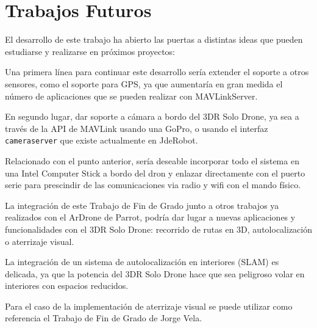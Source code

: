 \section{Trabajos Futuros}

El desarrollo de este trabajo ha abierto las puertas a distintas ideas que pueden estudiarse y realizarse en próximos proyectos:

Una primera línea para continuar este desarrollo sería extender el soporte a otros sensores, como el soporte para GPS, ya que aumentaría en gran medida el número de aplicaciones que se pueden realizar con MAVLinkServer. 

En segundo lugar, dar soporte a cámara a bordo del 3DR Solo Drone, ya sea a través de la API de MAVLink usando una GoPro, o usando el interfaz \texttt{cameraserver} que existe actualmente en JdeRobot.

Relacionado con el punto anterior, sería deseable incorporar todo el sistema en una Intel Computer Stick a bordo del dron y enlazar directamente con el puerto serie para prescindir de las comunicaciones via radio y wifi con el mando físico. 

La integración de este Trabajo de Fin de Grado junto a otros trabajos ya realizados con el ArDrone de Parrot, podría dar lugar a nuevas aplicaciones y funcionalidades con el 3DR Solo Drone: recorrido de rutas en 3D, autolocalización o aterrizaje visual. 

La integración de un sistema de autolocalización en interiores (SLAM) es delicada, ya que la potencia del 3DR Solo Drone hace que sea peligroso volar en interiores con espacios reducidos. 

Para el caso de la implementación de aterrizaje visual se puede utilizar como referencia el Trabajo de Fin de Grado de Jorge Vela\cite{jorgeVela}.